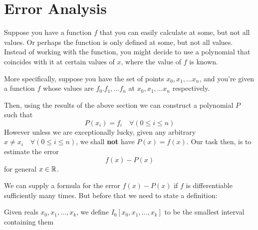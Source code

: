 \section{Error Analysis}
Suppose you have a function $f$ that you can easily calculate at some, but not all values. Or perhaps the function is only defined at some, but not all values. Instead of working with the function, you might decide to use a polynomial that coincides with it at certain values of $x$, where the value of $f$ is known.

More specifically, suppose you have the set of points $x_0, x_1, \dots x_n$, and you're given a function $f$ whose values are $f_0. f_1, \dots f_n$ at $x_0, x_1, \dots x_n$ respectively.

Then, using the results of the above section we can construct a polynomial $P$ such that
\[
  P(x_i) = f_i \quad \forall(0 \leq i \leq n)
\]
However unless we are exceptionally lucky, given any arbitrary $x \neq x_i \quad \forall(0 \leq i \leq n)$, we shall \textbf{not} have $P(x) = f(x)$. Our task then, is to estimate the error
\[
  f(x) - P(x)
\]
for general $x \in \mathbb{R}$.

We can supply a formula for the error $f(x) - P(x)$ if $f$ is differentiable sufficiently many times. But before that we need to state a definition:
\begin{defn}
  Given reals $x_0, x_1, \dots ,x_k$, we define $I_0[x_0, x_1, \dots ,x_k]$ to be the smallest interval containing them
\end{defn}

